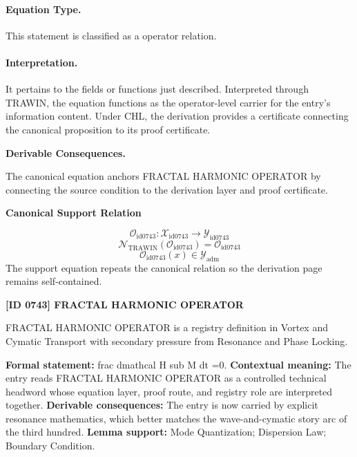 \paragraph{Equation Type.}
This statement is classified as a operator relation.

\paragraph{Interpretation.}
It pertains to the fields or functions just described. Interpreted through TRAWIN, the equation functions as the operator-level carrier for the entry’s information content. Under CHL, the derivation provides a certificate connecting the canonical proposition to its proof certificate.

\par\vspace{0.35em}
\noindent\textbf{Derivable Consequences.}\quad
\begingroup
\footnotesize
\raggedright
The canonical equation anchors FRACTAL HARMONIC OPERATOR by connecting the source condition to the derivation layer and proof certificate.
\par\endgroup

\noindent\textbf{Canonical Support Relation}\par
\[
\mathcal{O}_{\mathrm{id0743}}:\mathcal{X}_{\mathrm{id0743}}\longrightarrow\mathcal{Y}_{\mathrm{id0743}}
\]
\[
\mathcal{N}_{\mathrm{TRAWIN}}(\mathcal{O}_{\mathrm{id0743}})=\mathcal{O}_{\mathrm{id0743}}
\]
\[
\mathcal{O}_{\mathrm{id0743}}(x)\in\mathcal{Y}_{\mathrm{adm}}
\]
\noindent The support equation repeats the canonical relation so the derivation page remains self-contained.\par

\clearpage
\noindent\textbf{[ID 0743] FRACTAL HARMONIC OPERATOR}\par
\vspace{0.35em}
\begingroup\small
{}
FRACTAL HARMONIC OPERATOR is a registry definition in Vortex and Cymatic Transport with secondary pressure from Resonance and Phase Locking.

\begingroup\footnotesize\setlength{\emergencystretch}{3em}\sloppy
\textbf{Formal statement:} frac dmathcal H sub M dt =0. \textbf{Contextual meaning:} The entry reads FRACTAL HARMONIC OPERATOR as a controlled technical headword whose equation layer, proof route, and registry role are interpreted together. \textbf{Derivable consequences:} The entry is now carried by explicit resonance mathematics, which better matches the wave-and-cymatic story arc of the third hundred. \textbf{Lemma support:} Mode Quantization; Dispersion Law; Boundary Condition.\par
\endgroup

